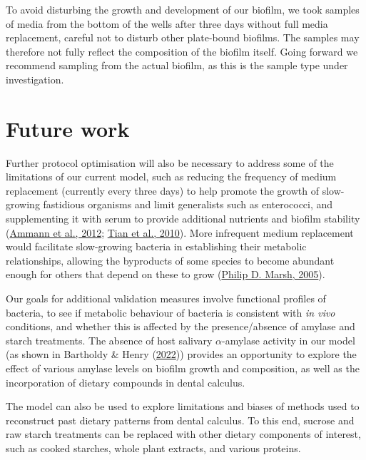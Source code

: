 \documentclass[
  letterpaper,
]{book}
\begin{document}
To avoid disturbing the growth and development of our biofilm, we took
samples of media from the bottom of the wells after three days without
full media replacement, careful not to disturb other plate-bound
biofilms. The samples may therefore not fully reflect the composition of
the biofilm itself. Going forward we recommend sampling from the actual
biofilm, as this is the sample type under investigation.

\hypertarget{future-work}{%
\section{Future work}\label{future-work}}

Further protocol optimisation will also be necessary to address some of
the limitations of our current model, such as reducing the frequency of
medium replacement (currently every three days) to help promote the
growth of slow-growing fastidious organisms and limit generalists such
as enterococci, and supplementing it with serum to provide additional
nutrients and biofilm stability
(\protect\hyperlink{ref-ammannZurichBiofilm2012}{Ammann et al., 2012};
\protect\hyperlink{ref-tianUsingDGGE2010}{Tian et al., 2010}). More
infrequent medium replacement would facilitate slow-growing bacteria in
establishing their metabolic relationships, allowing the byproducts of
some species to become abundant enough for others that depend on these
to grow (\protect\hyperlink{ref-marshDentalPlaque2005}{Philip D. Marsh,
2005}).

Our goals for additional validation measures involve functional profiles
of bacteria, to see if metabolic behaviour of bacteria is consistent
with \emph{in vivo} conditions, and whether this is affected by the
presence/absence of amylase and starch treatments. The absence of host
salivary \(\alpha\)-amylase activity in our model (as shown in Bartholdy
\& Henry
(\protect\hyperlink{ref-bartholdyInvestigatingBiases2022}{2022}))
provides an opportunity to explore the effect of various amylase levels
on biofilm growth and composition, as well as the incorporation of
dietary compounds in dental calculus.

The model can also be used to explore limitations and biases of methods
used to reconstruct past dietary patterns from dental calculus. To this
end, sucrose and raw starch treatments can be replaced with other
dietary components of interest, such as cooked starches, whole plant
extracts, and various proteins.
\end{document}
